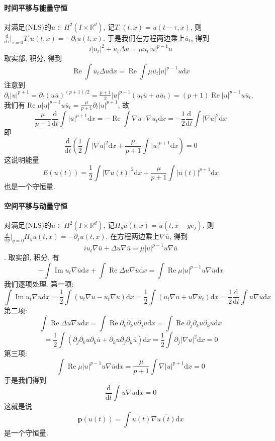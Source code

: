 \documentclass{ctexbook}
\theoremstyle{definition}
\theoremstyle{remark}
\newcommand{\dif}{\mathrm{d}}
\newcommand{\ovl}{\overline}
\begin{document}
\paragraph{时间平移与能量守恒}对满足(NLS)的$u\in H^2(I\times\mathbb{R}^d)$, 记$T_\tau(t,x)=u(t-\tau,x)$, 则$\frac{\dif}{\dif \tau}|_{\tau=0}T_\tau u(t,x)=-\partial_tu(t,x)$. 于是我们在方程两边乘上$\overline{u}_t$, 得到
$$i|u_t|^2+\overline{u}_t\Delta u=\mu\overline{u}_t|u|^{p-1}u$$
取实部, 积分, 得到
$$\operatorname{Re}\int\overline{u}_t\Delta u\dif x=\operatorname{Re}\int\mu\overline{u}_t|u|^{p-1}u\dif x $$
注意到$\partial_t|u|^{p+1}=\partial_t(u\overline{u})^{(p+1)/2}=\frac{p+1}{2}|u|^{p-1}(u_t\overline{u}+u\overline{u}_t)=(p+1)\operatorname{Re}|u|^{p-1}u\overline{u}_t$, 我们有$\operatorname{Re}\mu|u|^{p-1}u\overline{u}_t=\frac{\mu}{p+1}\partial_t|u|^{p+1}$, 故
$$\frac{\mu}{p+1}\frac{\dif}{\dif t}\int|u|^{p+1}\dif x=-\operatorname{Re}\int\nabla u\cdot\nabla\overline{u}_t\dif x=-\frac{1}{2}\frac{\dif}{\dif t}\int|\nabla u|^2\dif x$$
即
$$\frac{\dif}{\dif t}\left(\frac{1}{2}\int|\nabla u|^2\dif x+\frac{\mu}{p+1}\int|u|^{p+1}\dif x\right)=0$$
这说明能量
$$E(u(t))=\frac{1}{2}\int|\nabla u(t)|^2\dif x+\frac{\mu}{p+1}\int|u(t)|^{p+1}\dif x$$
也是一个守恒量. 

\paragraph{空间平移与动量守恒}对满足(NLS)的$u\in H^2(I\times\mathbb{R}^d)$, 记$\Pi_{y}u(t,x)=u(t,x-ye_j)$, 则$\frac{\dif}{\dif y}|_{y=0}\Pi_yu(t,x)=-\partial_ju(t,x)$. 在方程两边乘上$\nabla\overline{u}$, 得到
$$iu_t\nabla\overline{u}+\Delta u\nabla\overline{u}=\mu|u|^{p-1}u\nabla\overline{u}$$. 
取实部, 积分, 有
$$-\int\operatorname{Im}u_t\nabla\overline{u}\dif x+\int\operatorname{Re}\Delta u\nabla\overline{u}\dif x=\int\operatorname{Re}\mu|u|^{p-1}u\nabla\overline{u}\dif x$$
我们逐项处理. 第一项: 
$$\int\operatorname{Im}u_t\nabla\overline{u}\dif x=\frac{1}{2}\int(u_t\nabla\overline{u}-\overline{u}_t\nabla u)\dif x=\frac{1}{2}\int(u_t\nabla\overline{u}+u\nabla\overline{u}_t)\dif x=\frac{1}{2}\frac{\dif}{\dif t}\int u\nabla\overline{u}\dif x$$
第二项: 
$$\int\operatorname{Re}\Delta u\nabla\overline{u}\dif x=\int\operatorname{Re}\partial_k\partial_ku\partial_j\ovl u\dif x=\int\operatorname{Re}\partial_j\partial_ku\partial_k\ovl u\dif x$$
$$=\frac{1}{2}\int(\partial_j\partial_ku\partial_k\ovl u+\partial_ku\partial_j\partial_k\ovl u)\dif x=\frac{1}{2}\int\partial_j|\nabla u|^2\dif x=0$$
第三项: 
$$\int\operatorname{Re}\mu|u|^{p-1}u\nabla\overline{u}\dif x=\frac{\mu}{p+1}\int\nabla|u|^{p+1}\dif x=0$$
于是我们得到
$$\frac{\dif}{\dif t}\int u\nabla\overline{u}\dif x=0$$
这就是说
$$\bm{p}(u(t))=\int u(t)\nabla\ovl{u(t)}\dif x$$
是一个守恒量. 
\end{document}
